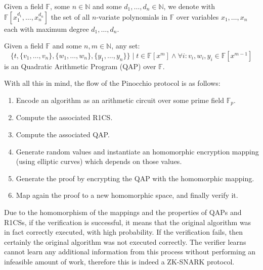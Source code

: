 \begin{definition}
	Given a field \(\mathbb{F}\), some \(n \in \mathbb{N}\) and some
	\(d_1, \dots, d_n \in \mathbb{N}\), we denote with \(\mathbb{F}[x_1^{d_1}, \dots, x_n^{d_n}]\)
	the set of all \(n\)-variate polynomials in \(\mathbb{F}\) over variables \(x_1, \dots, x_n\)
	each with maximum degree \(d_1, \dots, d_n\).
\end{definition}

\begin{definition}
	Given a field \(\mathbb{F}\) and some \(n,m \in \mathbb{N}\), any set:
	\[ \{t, \{v_1, \dots, v_n\}, \{w_1, \dots, w_n\}, \{y_1, \dots, y_n\} \} \mid
		t \in \mathbb{F}[x^m] \wedge \forall i\colon v_i, w_i, y_i \in \mathbb{F}[x^{m-1}]\]
	is an Quadratic Arithmetic Program (QAP) over \(\mathbb{F}\).
\end{definition}

\noindent
With all this in mind, the flow of the Pinocchio protocol is as follows:
\begin{enumerate}
	\item Encode an algorithm as an arithmetic circuit over some prime field \(\mathbb{F}_p\).
	\item Compute the associated R1CS\@.
	\item Compute the associated QAP\@.
	\item Generate random values and instantiate an homomorphic encryption mapping
	      (using elliptic curves) which depends on those values.
	\item Generate the proof by encrypting the QAP with the homomorphic mapping.
	\item Map again the proof to a new homomorphic space, and finally verify it.
\end{enumerate}

\noindent Due to the homomorphism of the mappings and the properties of QAPs and R1CSs, if the
verification is successful, it means that the original algorithm was in fact correctly executed,
with high probability.
If the verification fails, then certainly the original algorithm was not executed correctly.
The verifier learns cannot learn any additional information from this process without performing
an infeasible amount of work, therefore this is indeed a ZK-SNARK protocol.
